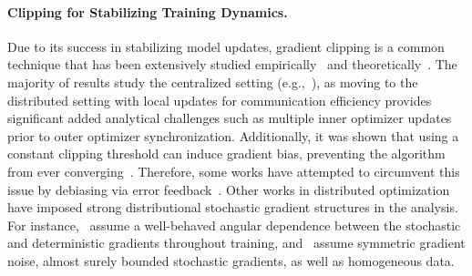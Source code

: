 \vspace{-1mm}
\paragraph{Clipping for Stabilizing Training Dynamics.} 
Due to its success in stabilizing model updates, gradient clipping is a common technique that has been extensively studied empirically~\cite{empirical1,empirical2,empirical3,empirical5} and theoretically~\cite{inprobsupreme,HeavyTailedNoisePaper,HighProbAdaGConv,highprobClip,theoretical1,theoretical4,GradClipCentralGeomPerspective,RevisitGradClipModern,clippedsgd_online_estimate}. 
The majority of results study the centralized setting (e.g.,~\cite{CentralClip5,CentralClip4,CentralClip3,CentralClip2,CentralClip1plus,CentralBddVarClip, CentralBddVarClip1}), as moving to the distributed setting with local updates for communication efficiency provides significant added analytical challenges such as multiple inner optimizer updates prior to outer optimizer synchronization. Additionally, it was shown that using a constant clipping threshold can induce gradient bias, preventing the algorithm from ever converging~\cite{GradClipCentralGeomPerspective,RevisitGradClipModern}. Therefore, some works have attempted to circumvent this issue by debiasing via error feedback~\cite{Debias1,Debias2}. Other works in distributed optimization have imposed strong distributional stochastic gradient structures in the analysis. For instance,~\cite{angulardependencerestrictive}
assume a well-behaved angular dependence between the stochastic and deterministic gradients throughout training, and~\cite{symmetricnoise_distributed} assume symmetric gradient noise, almost surely bounded stochastic gradients, as well as homogeneous data. 

